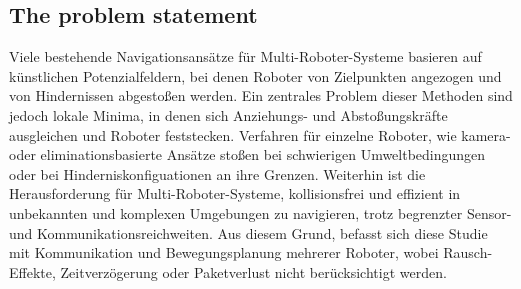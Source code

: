 \documentclass[conference]{IEEEtran}
\begin{document}
\subsection*{The problem statement}
Viele bestehende Navigationsansätze für Multi-Roboter-Systeme basieren auf künstlichen 
Potenzialfeldern, bei denen Roboter von Zielpunkten angezogen und von Hindernissen 
abgestoßen werden. Ein zentrales Problem dieser Methoden sind jedoch lokale Minima, in 
denen sich Anziehungs- und Abstoßungskräfte ausgleichen und Roboter feststecken. 
Verfahren für einzelne Roboter, wie kamera- oder eliminationsbasierte Ansätze stoßen bei 
schwierigen Umweltbedingungen oder bei Hinderniskonfiguationen an ihre Grenzen.
Weiterhin ist die Herausforderung für Multi-Roboter-Systeme, kollisionsfrei und 
effizient in unbekannten und komplexen Umgebungen zu navigieren, trotz begrenzter 
Sensor- und Kommunikationsreichweiten. 
Aus diesem Grund, befasst sich diese Studie mit Kommunikation und Bewegungsplanung mehrerer Roboter,
wobei Rausch-Effekte, Zeitverzögerung oder Paketverlust nicht berücksichtigt werden.
\end{document}
